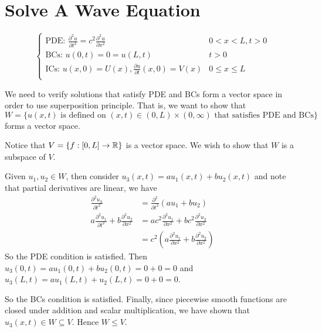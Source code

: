\documentclass[class=article,crop=false]{standalone}
\begin{document}
\newpage
\section{Solve A Wave Equation}
\begin{equation*}
\begin{cases}
	\text{PDE: } \frac{\partial^2 u}{\partial { t}^2} = c^2 \frac{\partial^2 u}{\partial { x}^2}  & 0<x<L, t>0 \\
	\text{BCs: } u(0,t)=0=u(L,t) & t>0 \\
	\text{ICs: } u(x,0)=U(x), \frac{\partial u}{\partial t} (x,0) = V(x) & 0 \leq x \leq L \\
\end{cases}
\end{equation*}

We need to verify solutions that satisfy PDE and BCs form a vector space in order to use superposition principle. That is, we want to show that
\[
	W=\{u(x,t) \text{ is defined on } (x,t) \in (0,L) \times (0,\infty) \text{ that satisfies PDE and BCs} \} 
\] 
forms a vector space.

\begin{prf}
	Notice that $V= \{f:[0,L] \to \mathbb{R}\} $ is a vector space. We wish to show that $ W$ is a subspace of  $ V$. 

	Given $ u_1, u_2 \in W$, then consider $ u_3(x,t) = a u_1(x,t) + b u_2(x,t)$ and note that partial derivatives are linear, we have
\begin{align*}
	\frac{\partial^2 u_3}{\partial { t}^2} &= \frac{\partial^2 }{\partial { t}^2} (a u_1 + b u_2)\\
	a \frac{\partial^2 u_1}{\partial { t}^2} + b \frac{\partial^2 u_2}{\partial { x}^2} &= a c^2 \frac{\partial^2 u_1}{\partial { x}^2} + b c^2 \frac{\partial^2 u_2}{\partial { x}^2}\\
											    &= c^2 (a \frac{\partial^2 u_1}{\partial { x}^2} + b \frac{\partial^2 u_2}{\partial { x}^2} ) 
\end{align*}
So the PDE condition is satisfied. Then $ u_3(0,t) = a u_1(0,t) + b u_2(0,t) = 0+0=0$ and $ u_3(L,t) = a u_1(L,t) + u_2(L,t) = 0+0=0$.

So the BCs condition is satisfied. Finally, since piecewise smooth functions are closed under addition and scalar multiplication, we have shown that $ u_3(x,t) \in W \subseteq V$. Hence $ W \leq V$. 
\end{prf}
\end{document}
